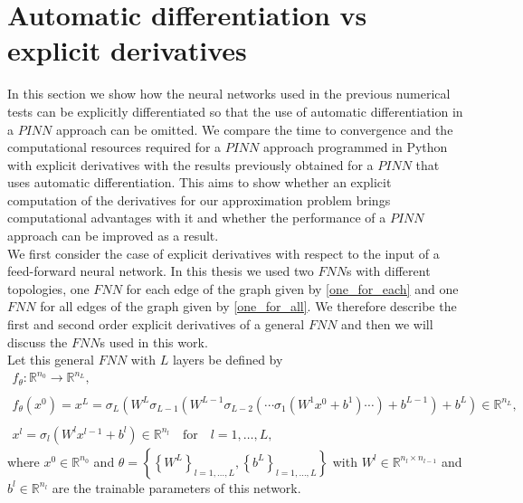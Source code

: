 \section{Automatic differentiation vs explicit derivatives}
\label{ch3:sec3}

In this section we show how the neural networks used in the previous numerical tests can be explicitly differentiated so that the use of automatic differentiation in a $PINN$ approach can be omitted. We compare the time to convergence and the computational resources required for a $PINN$ approach programmed in Python with explicit derivatives with the results previously obtained for a $PINN$ that uses automatic differentiation. This aims to show whether an explicit computation of the derivatives for our approximation problem brings computational advantages with it and whether the performance of a $PINN$ approach can be improved as a result. \\
We first consider the case of explicit derivatives with respect to the input of a feed-forward neural network. In this thesis we used two $FNN$s with different topologies, one $FNN$ for each edge of the graph given by \cref{one_for_each} and one $FNN$ for all edges of the graph given by \cref{one_for_all}. We therefore describe the first and second order explicit derivatives of a general $FNN$ and then we will discuss the $FNN$s used in this work. \\
Let this general $FNN$ with $L$ layers be defined by 
\begin{equation} 
    \label{model prediction}
    \begin{gathered}
        f_{\theta} \colon \mathbb{R}^{n_0} \to \mathbb{R}^{n_L}, \\
        \\
        f_{\theta}\left(x^0\right) = x^L = \sigma_L\left(W^L \sigma_{L-1}\left(W^{L-1}\sigma_{L-2}\left(\cdots \sigma_{1}\left(W^{1}x^0 + b^1\right) \cdots\right) + b^{L-1}\right) + b^{L}\right) \in \mathbb{R}^{n_L}, \\
        \\
        x^l = \sigma_l\left(W^l x^{l-1} + b^l\right) \in \mathbb{R}^{n_l} \quad \text{for} \quad l = 1, \ldots, L,
    \end{gathered} 
\end{equation} 
where $x^0 \in \mathbb{R}^{n_0}$ and $\theta = \left\{ \left\{ W^L \right\}_{l = 1, \ldots, L}, \left\{ b^L \right\}_{l = 1, \ldots, L} \right\}$ with $W^l \in \mathbb{R}^{n_l \times n_{l-1}}$ and $b^l \in \mathbb{R}^{n_l}$ are the trainable parameters of this network. \\
